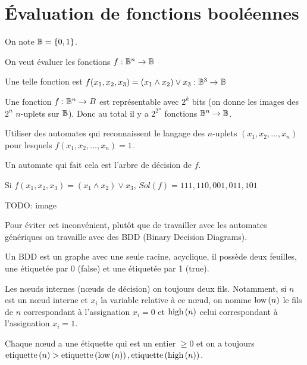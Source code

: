 \section{Évaluation de fonctions booléennes}

\begin{notation}
	On note $\mathbb{B} = \left\{0,1\right\}$.
\end{notation}

On veut évaluer les fonctions $f : \mathbb{B} ^ n \to \mathbb{B}$

\begin{exemple}
	Une telle fonction est $f(x_1,x_2,x_3) = (x_1 \land x_2) \lor x_3 : \mathbb{B}^3 \to \mathbb{B}$
\end{exemple}

Une fonction $f : \mathbb{B} ^ n \to B$ est représentable avec $2^k$ bits
(on donne les images des $2^n$ $n$-uplets sur $\mathbb{B}$).
Donc au total il y a $2^{2^n}$ fonctions $\mathbb{B}^n \to \mathbb{B}$.

\begin{idee}
	Utiliser des automates qui reconnaissent le langage des $n$-uplets
	$(x_1,x_2,\ldots, x_n)$ pour lesquels $f(x_1, x_2, \ldots, x_n) = 1$.
\end{idee}

Un automate qui fait cela est l'arbre de décision de $f$.

\begin{exemple}
	Si $f(x_1,x_2,x_3) = (x_1 \land x_2) \lor x_3$, $Sol(f) = 111,110,001,011,101$

	TODO: image
\end{exemple}


Pour éviter cet inconvénient, plutôt que de travailler avec les automates génériques
on travaille avec des BDD (Binary Decision Diagrams).

\begin{definition}
	Un BDD est un graphe avec une seule racine, acyclique, il possède deux feuilles,
	une étiquetée par 0 (false) et une étiquetée par 1 (true).

	Les nœuds internes (nœuds de décision) on toujours deux fils. Notamment, si $n$ est un nœud interne
	et $x_i$ la variable relative à ce nœud, on nomme $\text{low}\left(n\right)$ le fils de $n$ correspondant à l'assignation
	$x_i = 0$ et $\text{high}\left(n\right)$ celui correspondant à l'assignation $x_i = 1$.

	Chaque nœud a une étiquette qui est un entier $\geq 0$ et on a toujours $\text{etiquette}\left(n\right) > \text{etiquette}\left(\text{low}\left(n\right)\right),  \text{etiquette}\left(\text{high}\left(n\right)\right)$.
\end{definition}


